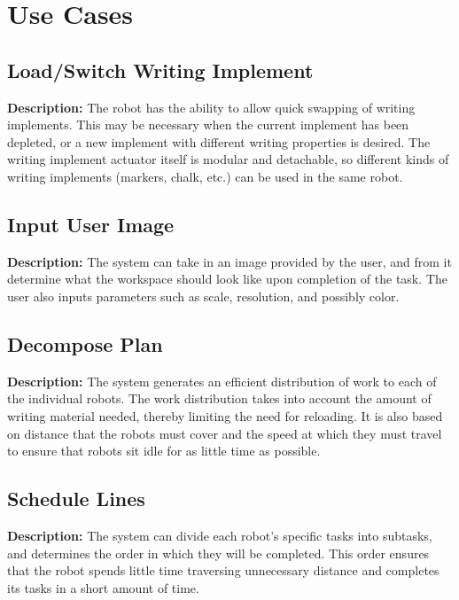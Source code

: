 
\section{Use Cases}
\label{sec:use_cases}



\subsection{Load/Switch Writing Implement}
\textbf{Description:} The robot has the ability to allow quick swapping of writing implements. This may be necessary when the current implement has been depleted, or a new  implement with different writing properties is desired. The writing implement actuator itself is modular and detachable, so different kinds of writing implements (markers, chalk, etc.) can be used in the same robot.

\subsection{Input User Image}
\textbf{Description:} The system can take in an image provided by the user, and from it determine what the workspace should look like upon completion of the task. The user also inputs parameters such as scale, resolution, and possibly color. 

\subsection{Decompose Plan}
\textbf{Description:} The system generates an efficient distribution of work to each of the individual robots. The work distribution takes into account the amount of writing material needed, thereby limiting the need for reloading. It is also based on distance that the robots must cover and the speed at which they must travel to ensure that robots sit idle for as little time as possible.

\subsection{Schedule Lines}
\textbf{Description:} The system can divide each robot's specific tasks into subtasks, and determines the order in which they will be completed. This order ensures that the robot spends little time traversing unnecessary distance and completes its tasks in a short amount of time.

